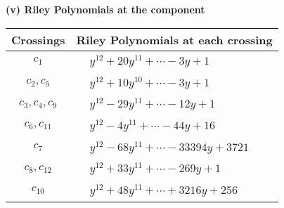 \documentclass[1p]{elsarticle_modified}
\theoremstyle{definition}
\begin{document}
\flushleft \textbf{(v) Riley Polynomials at the component}\newline \\
\begin{tabular}{m{50pt}|m{274pt}}
Crossings & \hspace{64pt}Riley Polynomials at each crossing \\
\hline $$\begin{aligned}c_{1}\end{aligned}$$&$\begin{aligned}
&y^{12}+20 y^{11}+\cdots-3 y+1
\end{aligned}$\\
\hline $$\begin{aligned}c_{2},c_{5}\end{aligned}$$&$\begin{aligned}
&y^{12}+10 y^{10}+\cdots-3 y+1
\end{aligned}$\\
\hline $$\begin{aligned}c_{3},c_{4},c_{9}\end{aligned}$$&$\begin{aligned}
&y^{12}-29 y^{11}+\cdots-12 y+1
\end{aligned}$\\
\hline $$\begin{aligned}c_{6},c_{11}\end{aligned}$$&$\begin{aligned}
&y^{12}-4 y^{11}+\cdots-44 y+16
\end{aligned}$\\
\hline $$\begin{aligned}c_{7}\end{aligned}$$&$\begin{aligned}
&y^{12}-68 y^{11}+\cdots-33394 y+3721
\end{aligned}$\\
\hline $$\begin{aligned}c_{8},c_{12}\end{aligned}$$&$\begin{aligned}
&y^{12}+33 y^{11}+\cdots-269 y+1
\end{aligned}$\\
\hline $$\begin{aligned}c_{10}\end{aligned}$$&$\begin{aligned}
&y^{12}+48 y^{11}+\cdots+3216 y+256
\end{aligned}$\\
\hline
\end{tabular}\\~\\
\end{document}
